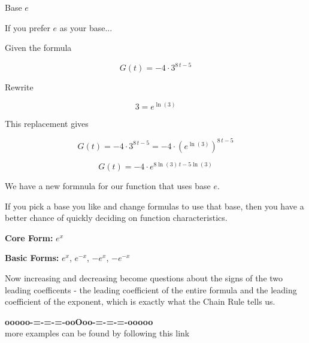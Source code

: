 \documentclass{ximera}
\begin{document}
\begin{example} Base $e$

If you prefer $e$ as your base...


Given the formula 

\[
G(t) = -4 \cdot 3^{8 \, t - 5}
\]



Rewrite 

\[
3 = e^{\ln(3)}
\]


This replacement gives 



\[
G(t) = -4 \cdot 3^{8 \, t - 5} = -4 \cdot \left( e^{\ln(3)} \right)^{8 \, t - 5}
\]

\[
G(t) = -4 \cdot e^{8 \ln(3) \, t - 5 \ln(3)}
\]


We have a new formnula for our function that uses base $e$.


\end{example}




If you pick a base you like and change formulas to use that base, then you have a better chance of quickly deciding on function characteristics. 



\textbf{\textcolor{blue!55!black}{Core Form:}}  $e^x$ 



\textbf{\textcolor{blue!55!black}{Basic Forms:}}  $e^x$, $e^{-x}$, $-e^x$, $-e^{-x}$ 


Now increasing and decreasing become questions about the signs of the two leading coefficents - the leading coefficient of the entire formula and the leading coefficient of the exponent, which is exactly what the Chain Rule tells us.



















\begin{onlineOnly}
\begin{center}
\textbf{\textcolor{green!50!black}{ooooo-=-=-=-ooOoo-=-=-=-ooooo}} \\

more examples can be found by following this link\\ 

\end{center}
\end{onlineOnly}
\end{document}
